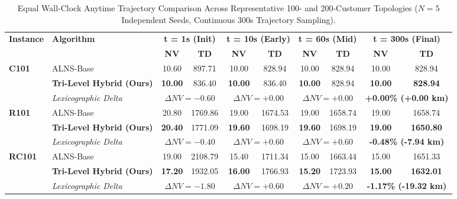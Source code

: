 \begin{table}[!t]
\caption{Equal Wall-Clock Anytime Trajectory Comparison Across Representative 100- and 200-Customer Topologies ($N=5$ Independent Seeds, Continuous 300s Trajectory Sampling).}
\label{tab:anytime_wallclock}
\centering
\footnotesize
\setlength{\tabcolsep}{4.5pt}
\begin{tabular*}{\textwidth}{@{\extracolsep{\fill}} ll cccccc cc @{}}
\toprule
\multirow{2}{*}{\textbf{Instance}} & \multirow{2}{*}{\textbf{Algorithm}} & \multicolumn{2}{c}{\textbf{t = 1s (Init)}} & \multicolumn{2}{c}{\textbf{t = 10s (Early)}} & \multicolumn{2}{c}{\textbf{t = 60s (Mid)}} & \multicolumn{2}{c}{\textbf{t = 300s (Final)}} \\
\cmidrule(lr){3-4} \cmidrule(lr){5-6} \cmidrule(lr){7-8} \cmidrule(lr){9-10}
 & & \textbf{NV} & \textbf{TD} & \textbf{NV} & \textbf{TD} & \textbf{NV} & \textbf{TD} & \textbf{NV} & \textbf{TD} \\
\midrule
\multirow{3}{*}{\textbf{C101}} & ALNS-Base & 10.60 & 897.71 & 10.00 & 828.94 & 10.00 & 828.94 & 10.00 & 828.94 \\
 & \textbf{Tri-Level Hybrid (Ours)} & \textbf{10.00} & 836.40 & \textbf{10.00} & 836.40 & \textbf{10.00} & 828.94 & \textbf{10.00} & \textbf{828.94} \\
 & \textit{Lexicographic Delta} & \multicolumn{2}{c}{$\Delta NV = -0.60$} & \multicolumn{2}{c}{$\Delta NV = +0.00$} & \multicolumn{2}{c}{$\Delta NV = +0.00$} & \multicolumn{2}{c}{\textbf{+0.00\% (+0.00 km)}} \\
\midrule
\multirow{3}{*}{\textbf{R101}} & ALNS-Base & 20.80 & 1769.86 & 19.00 & 1674.53 & 19.00 & 1658.74 & 19.00 & 1658.74 \\
 & \textbf{Tri-Level Hybrid (Ours)} & \textbf{20.40} & 1771.09 & \textbf{19.60} & 1698.19 & \textbf{19.60} & 1698.19 & \textbf{19.00} & \textbf{1650.80} \\
 & \textit{Lexicographic Delta} & \multicolumn{2}{c}{$\Delta NV = -0.40$} & \multicolumn{2}{c}{$\Delta NV = +0.60$} & \multicolumn{2}{c}{$\Delta NV = +0.60$} & \multicolumn{2}{c}{\textbf{-0.48\% (-7.94 km)}} \\
\midrule
\multirow{3}{*}{\textbf{RC101}} & ALNS-Base & 19.00 & 2108.79 & 15.40 & 1711.34 & 15.00 & 1663.44 & 15.00 & 1651.33 \\
 & \textbf{Tri-Level Hybrid (Ours)} & \textbf{17.20} & 1932.05 & \textbf{16.00} & 1766.93 & \textbf{15.20} & 1723.93 & \textbf{15.00} & \textbf{1632.01} \\
 & \textit{Lexicographic Delta} & \multicolumn{2}{c}{$\Delta NV = -1.80$} & \multicolumn{2}{c}{$\Delta NV = +0.60$} & \multicolumn{2}{c}{$\Delta NV = +0.20$} & \multicolumn{2}{c}{\textbf{-1.17\% (-19.32 km)}} \\

\end{tabular*}
\end{table}
